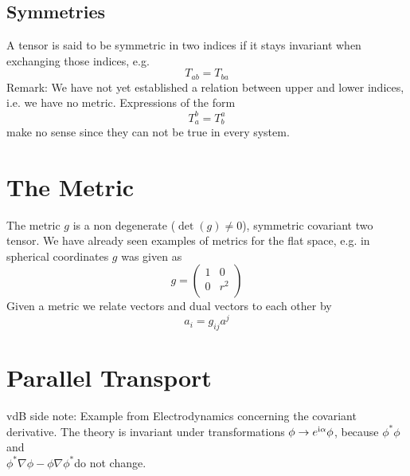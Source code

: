 \subsection{Symmetries}
A tensor is said to be symmetric in two indices if it stays invariant when exchanging those indices, e.g.
\begin{equation}
    T_{ab}=T_{ba}
\end{equation}
Remark: We have not yet established a relation between upper and lower indices, i.e. we have no metric. Expressions of the form
\begin{equation}
    T_a^b=T_b^a
\end{equation}
make no sense since they can not be true in every system.
\section{The Metric}
The metric $g$ is a non degenerate ($\det(g)\neq 0$), symmetric covariant two tensor. 
We have already seen examples of metrics for the flat space, e.g. in spherical coordinates $g$ was given as
\begin{equation}
    g=
    \begin{pmatrix}
        1 & 0\\
        0 & r^2\\
    \end{pmatrix}
\end{equation}
Given a metric we relate vectors and dual vectors to each other by
\begin{equation}
    a_i=g_{ij}a^j
\end{equation}
\section{Parallel Transport}
vdB side note: Example from Electrodynamics concerning the covariant derivative. 
The theory is invariant under transformations $\phi\to e^{\mathrm{i} \alpha}\phi$, 
because $\phi^*\phi$ and\\ $\phi^*\nabla\phi-\phi\nabla\phi^*$do not change.
